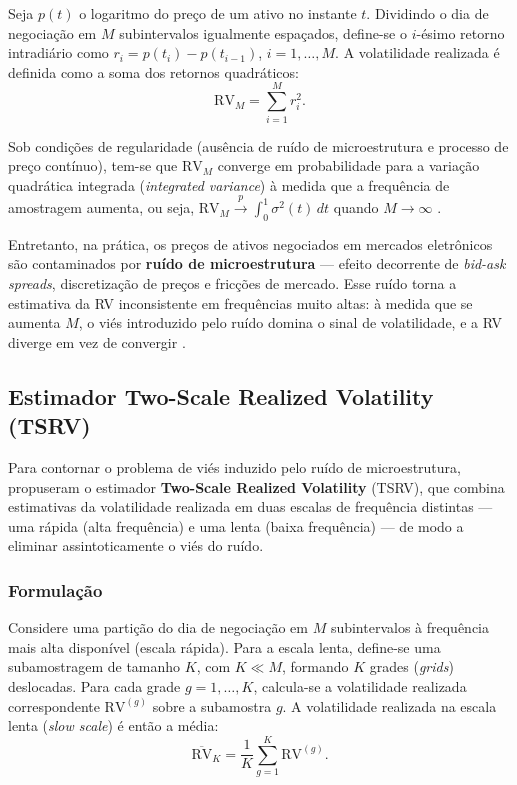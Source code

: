 Seja $p(t)$ o logaritmo do preço de um ativo no instante $t$. Dividindo o
dia de negociação em $M$ subintervalos igualmente espaçados, define-se o
$i$-ésimo retorno intradiário como $r_{i} = p(t_i) - p(t_{i-1})$,
$i = 1, \ldots, M$. A volatilidade realizada é definida como a soma dos
retornos quadráticos:
%
\begin{equation}
    \label{eq:rv}
    \text{RV}_M = \sum_{i=1}^{M} r_{i}^{2}.
\end{equation}

Sob condições de regularidade (ausência de ruído de microestrutura e
processo de preço contínuo), tem-se que $\text{RV}_M$ converge em
probabilidade para a variação quadrática integrada
(\emph{integrated variance}) à medida que a frequência de amostragem
aumenta, ou seja, $\text{RV}_M \xrightarrow{p} \int_0^1 \sigma^2(t)\,dt$
quando $M \to \infty$ \cite{andersen2003}.

Entretanto, na prática, os preços de ativos negociados em mercados
eletrônicos são contaminados por \textbf{ruído de microestrutura} --- efeito
decorrente de \emph{bid-ask spreads}, discretização de preços e fricções de
mercado. Esse ruído torna a estimativa da RV inconsistente em frequências
muito altas: à medida que se aumenta $M$, o viés introduzido pelo ruído
domina o sinal de volatilidade, e a RV diverge em vez de
convergir \cite{zhang2005}.

\subsection{Estimador Two-Scale Realized Volatility (TSRV)}
\label{subsec:tsrv}

Para contornar o problema de viés induzido pelo ruído de microestrutura,
 propuseram o estimador \textbf{Two-Scale Realized
Volatility} (TSRV), que combina estimativas da volatilidade realizada
em duas escalas de frequência distintas --- uma rápida (alta frequência) e
uma lenta (baixa frequência) --- de modo a eliminar assintoticamente o
viés do ruído.

\subsubsection{Formulação}

Considere uma partição do dia de negociação em $M$ subintervalos à
frequência mais alta disponível (escala rápida). Para a escala lenta,
define-se uma subamostragem de tamanho $K$, com $K \ll M$, formando $K$
grades (\emph{grids}) deslocadas. Para cada grade $g = 1, \ldots, K$,
calcula-se a volatilidade realizada correspondente
$\text{RV}^{(g)}$ sobre a subamostra $g$. A volatilidade realizada
na escala lenta (\emph{slow scale}) é então a média:
%
\begin{equation}
    \label{eq:rv_slow}
    \overline{\text{RV}}_K = \frac{1}{K} \sum_{g=1}^{K} \text{RV}^{(g)}.
\end{equation}

